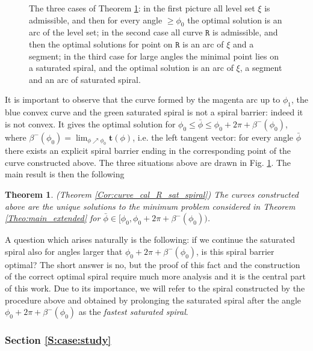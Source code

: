 \documentclass[reqno]{amsart}
\theoremstyle{definition} \newtheorem{definition}{Definition}[section]
\theoremstyle{definition} \newtheorem{remark}[definition]{Remark}
\theoremstyle{plain} \newtheorem{lemma}[definition]{Lemma}
\theoremstyle{plain} \newtheorem{proposition}[definition]{Proposition}
\theoremstyle{plain} \newtheorem{theorem}[definition]{Theorem}
\theoremstyle{plain} \newtheorem{corollary}[definition]{Corollary}
\theoremstyle{definition} \newtheorem{example}[definition]{Example}
\theoremstyle{plain} \newtheorem{claim}[clai]{Claim}
\theoremstyle{definition} \newtheorem{assumption}[definition]{Assumption}
\theoremstyle{definition} \newtheorem{observation}[definition]{Observation}
\newcommand{\1}{\mathbbm 1}
\numberwithin{equation}{section} %
\theoremstyle{plain} \newtheorem*{theorem*}{Theorem}
\theoremstyle{plain} \newtheorem{mthm}[maintheorem]{Main Theorem}
\theoremstyle{plain} \newtheorem*{mthm*}{Main Theorem}
\theoremstyle{plain} \newtheorem*{conjecture*}{Conjecture}
\theoremstyle{plain} \newtheorem{conjecture}[definition]{Conjecture}
\theoremstyle{plain} \newtheorem*{problem*}{Problem}
\begin{document}
\begin{figure}
\resizebox{\textwidth}{!}{}
\caption{The three cases of Theorem \ref{Cor:curve_cal_R_sat_spiral_intro}: in the first picture all level set $\xi$ is admissible, and then for every angle $\geq {\phi_0}$ the optimal solution is an arc of the level set; in the second case all curve $\mathtt R$ is admissible, and then the optimal solutions for point on $\mathtt R$ is an arc of $\xi$ and a segment; in the third case for large angles the minimal point lies on a saturated spiral, and the optimal solution is an arc of $\xi$, a segment and an arc of saturated spiral.}
\label{Fi:three_cases_intro}
\end{figure}

It is important to observe that the curve formed by the magenta arc up to $\phi_1$, the blue convex curve and the green saturated spiral is not a spiral barrier: indeed it is not convex. It gives the optimal solution for $\phi_0 \leq \bar \phi \leq \phi_0 + 2\pi + \beta^-(\phi_0)$, where $\beta^-(\phi_0) = \lim_{\phi \nearrow \phi_0} \mathbf t(\phi)$, i.e. the left tangent vector: for every angle $\bar \phi$ there exists an explicit spiral barrier ending in the corresponding point of the curve constructed above. The three situations above are drawn in Fig. \ref{Fi:three_cases_intro}. The main result is then the following

\begin{theorem}(Theorem \ref{Cor:curve_cal_R_sat_spiral})
\label{Cor:curve_cal_R_sat_spiral_intro}
The curves constructed above are the unique solutions to the minimum problem considered in Theorem \ref{Theo:main_extended} for ${\bar \phi} \in [{\phi_0},{\phi_0} + 2\pi + \beta^-({\phi_0}))$.
\end{theorem}

A question which arises naturally is the following: if we continue the saturated spiral also for angles larger that $\phi_0 + 2\pi + \beta^-(\phi_0)$, is this spiral barrier optimal? The short answer is no, but the proof of this fact and the construction of the correct optimal spiral require much more analysis and it is the central part of this work. Due to its importance, we will refer to the spiral constructed by the procedure above and obtained by prolonging the saturated spiral after the angle $\phi_ 0 + 2\pi + \beta^-(\phi_0)$ as the \emph{fastest saturated spiral}.


\subsubsection{Section \ref{S:case:study}}
\label{Sss:case_study_intro}
\end{document}
